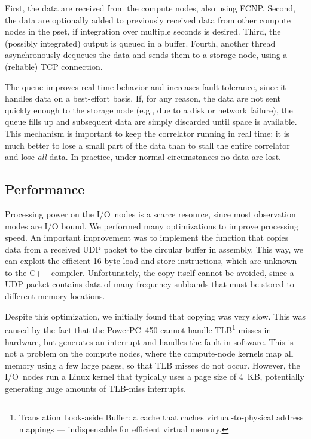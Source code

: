 \documentclass[conference]{IEEEtran}
\begin{document}
First, the data are received from the compute nodes, also using FCNP.
Second, the data are optionally added to previously received data from other
compute nodes in the pset, if integration over multiple seconds is desired.
Third, the (possibly integrated) output is queued in a buffer.
Fourth, another thread asynchronously dequeues the data and sends them to
a storage node, using a (reliable) TCP connection.

The queue improves real-time behavior and increases fault tolerance, since
it handles data on a best-effort basis.
If, for any reason, the data are not sent quickly enough to the storage node
(e.g., due to a disk or network failure), the queue fills up and subsequent
data are simply discarded until space is available.
This mechanism is important to keep the correlator running in real
time: it is much better to lose a small part of the data than to stall the
entire correlator and lose \emph{all\/} data.
In practice, under normal circumstances no data are lost.


\subsection{Performance}

Processing power on the I/O~nodes is a scarce resource, since most observation
modes are I/O bound.
We performed many optimizations to improve processing speed.
An important improvement was to implement
the function that copies data from a received UDP packet to the
circular buffer in assembly. This way, we can exploit the efficient 16-byte load and
store instructions, which are unknown to the C++ compiler.
Unfortunately, the copy itself cannot be avoided, since a UDP packet contains
data of many frequency subbands that must be stored to different memory
locations.

Despite this optimization, we initially found that copying was very slow.
This was caused by the fact that the PowerPC~450 cannot handle
TLB\footnote{Translation Look-aside Buffer: a cache that caches
virtual-to-physical address mappings --- indispensable for efficient virtual
memory.} misses in hardware, but generates an interrupt and handles the fault
in software.
This is not a problem on the compute nodes, where the compute-node kernels 
map all memory using a few large pages, so that TLB misses do not occur.
However, the I/O~nodes run a Linux kernel that typically uses a page size of
4~KB, potentially generating huge amounts of TLB-miss interrupts.
\end{document}
